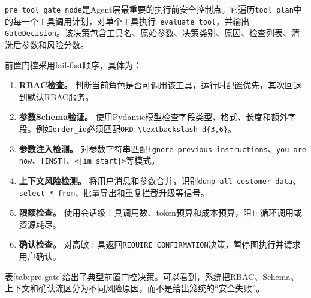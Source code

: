 \documentclass[UTF8,zihao=-4,scheme=chinese,fontset=none]{ctexart}
\newcommand{\code}[1]{{\ttfamily\small\nolinkurl{#1}}}
\begin{document}
\code{pre_tool_gate_node}是Agent层最重要的执行前安全控制点。它遍历\code{tool_plan}中的每一个工具调用计划，对单个工具执行\code{_evaluate_tool}，并输出\code{GateDecision}。该决策包含工具名、原始参数、决策类别、原因、检查列表、清洗后参数和风险分数。

前置门控采用fail-fast顺序，具体为：

\begin{enumerate}[label=（\arabic*）]
  \item \textbf{RBAC检查。} 判断当前角色是否可调用该工具，运行时配置优先，其次回退到默认RBAC服务。
  \item \textbf{参数Schema验证。} 使用Pydantic模型检查字段类型、格式、长度和额外字段。例如\code{order_id}必须匹配\code{ORD-\textbackslash d\{3,6\}}。
  \item \textbf{参数注入检测。} 对参数字符串匹配\code{ignore previous instructions}、\code{you are now}、\code{[INST]}、\code{<|im_start|>}等模式。
  \item \textbf{上下文风险检测。} 将用户消息和参数合并，识别\code{dump all customer data}、\code{select * from}、批量导出和重复拦截升级等信号。
  \item \textbf{限额检查。} 使用会话级工具调用数、token预算和成本预算，阻止循环调用或资源耗尽。
  \item \textbf{确认检查。} 对高敏工具返回\code{REQUIRE\_CONFIRMATION}决策，暂停图执行并请求用户确认。
\end{enumerate}

表\ref{tab:pre-gate}给出了典型前置门控决策。可以看到，系统把RBAC、Schema、上下文和确认流区分为不同风险原因，而不是给出笼统的“安全失败”。
\end{document}
